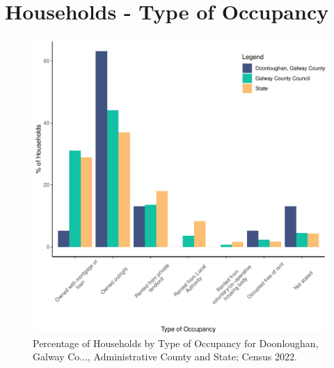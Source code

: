 \documentclass{article}
\begin{document}
\section{Households - Type of Occupancy}\label{sect:Households}
\begin{figure}[H]
	\centering
	\includegraphics[width = 140mm]{../figures/HouseholdsED.pdf}
	\caption{Percentage of Households by Type of Occupancy for Doonloughan, Galway Co..., Administrative County and State; Census 2022.}
	\label{fig:vbnv}
	\end{figure}
\end{document}
